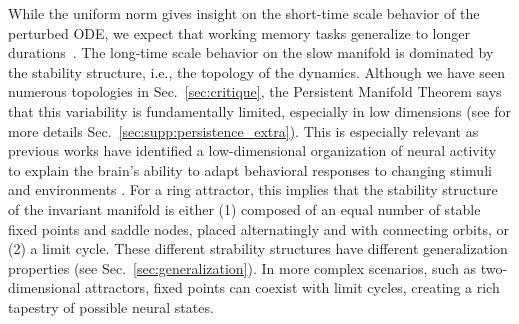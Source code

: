 \documentclass{article} %
\newcommand{\mpcomment}[1]{\textcolor{mpcolor}{(#1)}}
\newcommand{\pscomment}[1]{\textcolor{BurntOrange}{(#1)}}
\newcounter{ct}
\theoremstyle{definition}
\theoremstyle{remark}
\begin{document}
While the uniform norm gives insight on the short-time scale behavior of the perturbed ODE, we expect that working memory tasks generalize to longer durations~\citep{Park2023a}.
The long-time scale behavior on the slow manifold is dominated by the stability structure, i.e., the topology of the dynamics.
Although we have seen numerous topologies in Sec.~\ref{sec:critique}, the Persistent Manifold Theorem says that this variability is fundamentally limited, especially in low dimensions (see for more details Sec.~\ref{sec:supp:persistence_extra}).
This is especially relevant as previous works have identified a low-dimensional organization of neural activity to explain the brain's ability to adapt behavioral responses to changing stimuli and environments \citep{beiran2023parametric,altan2023low,fanthomme2021low}.
For a ring attractor, this implies that the stability structure of the invariant manifold is either
(1) composed of an equal number of stable fixed points and saddle nodes, placed alternatingly and with connecting orbits, or (2) a limit cycle.
These different strability structures have different generalization properties (see Sec.~\ref{sec:generalization}).
In more complex scenarios, such as two-dimensional attractors, fixed points can coexist with limit cycles, creating a rich tapestry of possible neural states.

\end{document}
